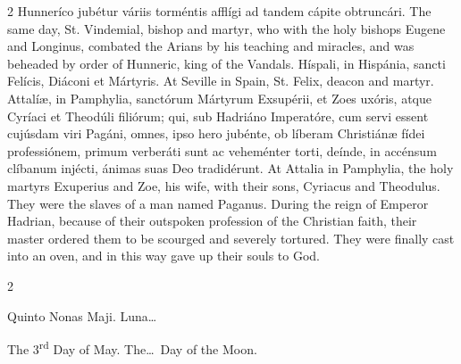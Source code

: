 \begin{paracol}{2}
 Hunneríco jubétur váriis torméntis afflígi ad tandem cápite obtruncári.
\switchcolumn
{}
The same day, St. Vindemial, bishop 
 and martyr, who with the holy bishops Eugene and Longinus, combated the 
 Arians by his teaching and miracles, and was beheaded by order of Hunneric, 
 king of the Vandals.
\switchcolumn*
{}
Híspali, in Hispánia, sancti Felícis, Diáconi et Mártyris.
\switchcolumn
{}
At Seville in Spain, St. Felix, 
 deacon and martyr.
\switchcolumn*
{}
Attalíæ, in Pamphylia, 
 sanctórum Mártyrum Exsupérii, et Zoes uxóris, atque Cyríaci et Theodúli 
 filiórum; qui, sub Hadriáno Imperatóre, cum servi essent cujúsdam viri 
 Pagáni, omnes, ipso hero jubénte, ob líberam Christiánæ fídei professiónem, 
 primum verberáti sunt ac veheménter torti, deínde, in accénsum clíbanum 
 injécti, ánimas suas Deo tradidérunt.
\switchcolumn
{}
At Attalia in Pamphylia, the holy 
 martyrs Exuperius and Zoe, his wife, with their sons, Cyriacus and Theodulus. 
 They were the slaves of a man named Paganus. During the reign of 
 Emperor Hadrian, because of their outspoken profession of the Christian 
 faith, their master ordered them to be scourged and severely tortured. 
 They were finally cast into an oven, and in this way gave up their souls to 
 God.
\switchcolumn*
{}
\end{paracol}


\begin{paracol}{2}
\begin{center}{\color{gregoriocolor} Quinto Nonas Maji. 
 Luna\dots\ }\end{center}
\switchcolumn
{}
\begin{center}{\color{gregoriocolor} The 
 3\textsuperscript{rd} Day of May. The\dots\ Day of the Moon.}\end{center}
\end{paracol}

